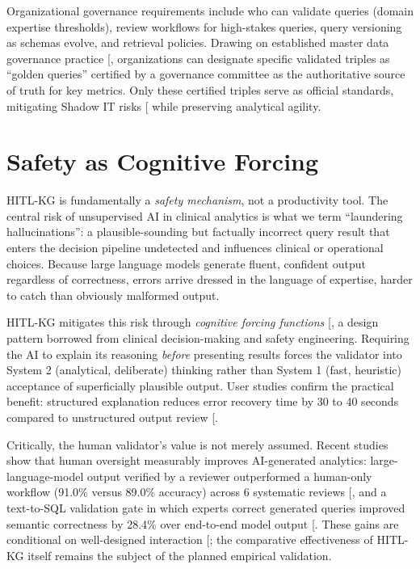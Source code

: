 \documentclass[
  american,
  11pt,
  letterpaper,
  oneside  ,captions=tableheading
]{scrartcl}
\begin{document}
Organizational governance requirements include who can validate queries
(domain expertise thresholds), review workflows for high-stakes queries,
query versioning as schemas evolve, and retrieval policies. Drawing on
established master data governance practice
{[}\citeproc{ref-loshin2010}{75}{]}, organizations can designate
specific validated triples as ``golden queries'' certified by a
governance committee as the authoritative source of truth for key
metrics. Only these certified triples serve as official standards,
mitigating Shadow IT risks {[}\citeproc{ref-zimmermann2017}{76}{]} while
preserving analytical agility.

\section{Safety as Cognitive Forcing}\label{safety-as-cognitive-forcing}

HITL-KG is fundamentally a \emph{safety mechanism}, not a productivity
tool. The central risk of unsupervised AI in clinical analytics is what
we term ``laundering hallucinations'': a plausible-sounding but
factually incorrect query result that enters the decision pipeline
undetected and influences clinical or operational choices. Because large
language models generate fluent, confident output regardless of
correctness, errors arrive dressed in the language of expertise, harder
to catch than obviously malformed output.

HITL-KG mitigates this risk through \emph{cognitive forcing functions}
{[}\citeproc{ref-ziletti2024}{38}{]}, a design pattern borrowed from
clinical decision-making and safety engineering. Requiring the AI to
explain its reasoning \emph{before} presenting results forces the
validator into System 2 (analytical, deliberate) thinking rather than
System 1 (fast, heuristic) acceptance of superficially plausible output.
User studies confirm the practical benefit: structured explanation
reduces error recovery time by 30 to 40 seconds compared to unstructured
output review {[}\citeproc{ref-ipeirotis2025}{77}{]}.

Critically, the human validator's value is not merely assumed. Recent
studies show that human oversight measurably improves AI-generated
analytics: large-language-model output verified by a reviewer
outperformed a human-only workflow (91.0\% versus 89.0\% accuracy)
across 6 systematic reviews {[}\citeproc{ref-gartlehner2025}{78}{]}, and
a text-to-SQL validation gate in which experts correct generated queries
improved semantic correctness by 28.4\% over end-to-end model output
{[}\citeproc{ref-benzarti2026}{79}{]}. These gains are conditional on
well-designed interaction {[}\citeproc{ref-ning2024}{80}{]}; the
comparative effectiveness of HITL-KG itself remains the subject of the
planned empirical validation.
\end{document}
